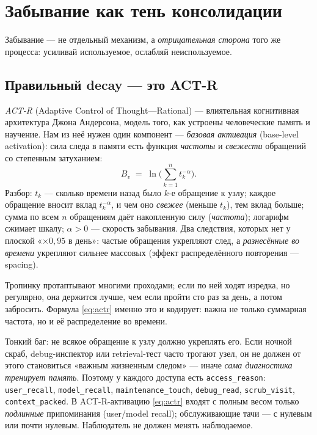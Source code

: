 \section{Забывание как тень консолидации}
\label{sec:decay}

Забывание — не отдельный механизм, а \emph{отрицательная сторона} того же процесса:
усиливай используемое, ослабляй неиспользуемое.

\subsection{Правильный decay — это ACT-R}

\emph{ACT-R} (Adaptive Control of Thought—Rational) — влиятельная когнитивная
архитектура Джона Андерсона, модель того, как устроены человеческие память и
научение. Нам из неё нужен один компонент — \emph{базовая активация} (base-level
activation): сила следа в памяти есть функция \emph{частоты} и \emph{свежести}
обращений со степенным затуханием:
\begin{equation}
B_v \;=\; \ln\!\Big(\sum_{k=1}^{n} t_k^{-\alpha}\Big).
\label{eq:actr}
\end{equation}
Разбор: $t_k$ — сколько времени назад было $k$-е обращение к узлу; каждое обращение
вносит вклад $t_k^{-\alpha}$, и чем оно \emph{свежее} (меньше $t_k$), тем вклад
больше; сумма по всем $n$ обращениям даёт накопленную силу (\emph{частота});
логарифм сжимает шкалу; $\alpha>0$ — скорость забывания. Два следствия, которых нет
у плоской «$\times 0{,}95$ в день»: частые обращения укрепляют след, а
\emph{разнесённые во времени} укрепляют сильнее массовых (эффект распределённого
повторения — spacing).

\begin{intuition}
Тропинку протаптывают многими проходами; если по ней ходят изредка, но регулярно,
она держится лучше, чем если пройти сто раз за день, а потом забросить. Формула
\eqref{eq:actr} именно это и кодирует: важна не только суммарная частота, но и её
распределение во времени.
\end{intuition}

\begin{pitfall}
Тонкий баг: не всякое обращение к узлу должно укреплять его. Если ночной скраб,
debug-инспектор или retrieval-тест часто трогают узел, он не должен от этого
становиться «важным жизненным следом» — иначе \emph{сама диагностика тренирует
память}. Поэтому у каждого доступа есть \texttt{access\_reason}: \texttt{user\_recall},
\texttt{model\_recall}, \texttt{maintenance\_touch}, \texttt{debug\_read},
\texttt{scrub\_visit}, \texttt{context\_packed}. В ACT-R-активацию \eqref{eq:actr}
входят с полным весом только \emph{подлинные} припоминания (user/model recall);
обслуживающие тачи — с нулевым или почти нулевым. Наблюдатель не должен менять
наблюдаемое.
\end{pitfall}


